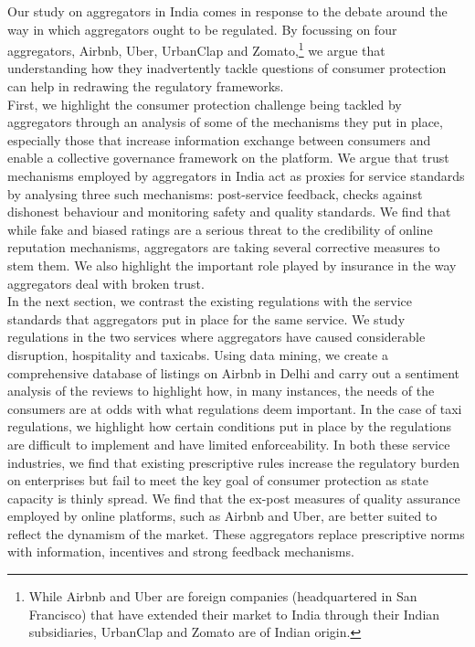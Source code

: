 \documentclass[a4paper, 12pt, twoside]{article}
\begin{document}
                    Our study on aggregators in India comes in response to the debate around the way in which aggregators ought to be regulated. By focussing on four aggregators, Airbnb, Uber, UrbanClap and Zomato,\footnote{While Airbnb and Uber are foreign companies (headquartered in San Francisco) that have extended their market to India through their Indian subsidiaries, UrbanClap and Zomato are of Indian origin.} we argue that understanding how they inadvertently tackle questions of consumer protection can help in redrawing the regulatory frameworks. \\
                    
                   First, we highlight the consumer protection challenge being tackled by aggregators through an analysis of some of the mechanisms they put in place, especially those that increase information exchange between consumers and enable a collective governance framework on the platform. We argue that trust mechanisms employed by aggregators in India act as proxies for service standards by analysing three such mechanisms: post-service feedback, checks against dishonest behaviour and monitoring safety and quality standards. We find that while fake and biased ratings are a serious threat to the credibility of online reputation mechanisms, aggregators are taking several corrective measures to stem them. We also highlight the important role played by insurance in the way aggregators deal with broken trust.\\
                    
                  In the next section, we contrast the existing regulations with the service standards that aggregators put in place for the same service. We study regulations in the two services where aggregators have caused considerable disruption, hospitality and taxicabs. Using data mining, we create a comprehensive database of listings on Airbnb in Delhi and carry out a sentiment analysis of the reviews to highlight how, in many instances, the needs of the consumers are at odds with what regulations deem important. In the case of taxi regulations, we highlight how certain conditions put in place by the regulations are difficult to implement and have limited enforceability. In both these service industries, we find that existing prescriptive rules increase the regulatory burden on enterprises but fail to meet the key goal of consumer protection as state capacity is thinly spread. We find that the ex-post measures of quality assurance employed by online platforms, such as Airbnb and Uber, are better suited to reflect the dynamism of the market. These aggregators replace prescriptive norms with information, incentives and strong feedback mechanisms. \\
                    
\end{document}
